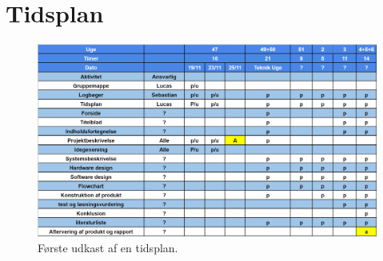 \section{Tidsplan}

\begin{figure}[H]
\centering
\includegraphics[scale=0.8, angle = 90]{Billeder/Tidsplan_23_11_2018}
\caption{Første udkast af en tidsplan.}
\label{fig:tidsplan_1}
\end{figure}